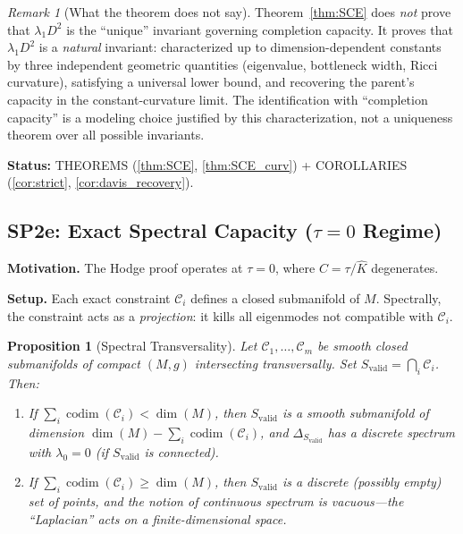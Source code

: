 \documentclass[11pt]{article}
\newtheorem{proposition}[theorem]{Proposition}
\theoremstyle{definition}
\theoremstyle{remark}
\newtheorem{remark}[theorem]{Remark}
\begin{document}
\begin{remark}[What the theorem does not say]\label{rem:notunique}
Theorem~\ref{thm:SCE} does \emph{not} prove that $\lambda_1 D^2$ is the ``unique'' invariant governing completion capacity. It proves that $\lambda_1 D^2$ is a \emph{natural} invariant: characterized up to dimension-dependent constants by three independent geometric quantities (eigenvalue, bottleneck width, Ricci curvature), satisfying a universal lower bound, and recovering the parent's capacity in the constant-curvature limit. The identification with ``completion capacity'' is a modeling choice justified by this characterization, not a uniqueness theorem over all possible invariants.
\end{remark}

\textbf{Status:} THEOREMS (\ref{thm:SCE}, \ref{thm:SCE_curv}) + COROLLARIES (\ref{cor:strict}, \ref{cor:davis_recovery}).


\subsection{SP2e: Exact Spectral Capacity ($\tau = 0$ Regime)}

\textbf{Motivation.} The Hodge proof operates at $\tau = 0$, where $C = \tau/\hat{K}$ degenerates.

\textbf{Setup.} Each exact constraint $\mathcal{C}_i$ defines a closed submanifold of $M$. Spectrally, the constraint acts as a \emph{projection}: it kills all eigenmodes not compatible with $\mathcal{C}_i$.

\begin{proposition}[Spectral Transversality]\label{prop:trans}
Let $\mathcal{C}_1, \ldots, \mathcal{C}_m$ be smooth closed submanifolds of compact $(M,g)$ intersecting transversally. Set $S_{\mathrm{valid}} = \bigcap_i \mathcal{C}_i$. Then:
\begin{enumerate}[nosep, label=(\roman*)]
\item If $\sum_i \operatorname{codim}(\mathcal{C}_i) < \dim(M)$, then $S_{\mathrm{valid}}$ is a smooth submanifold of dimension $\dim(M) - \sum_i\operatorname{codim}(\mathcal{C}_i)$, and $\Delta_{S_{\mathrm{valid}}}$ has a discrete spectrum with $\lambda_0 = 0$ (if $S_{\mathrm{valid}}$ is connected).
\item If $\sum_i \operatorname{codim}(\mathcal{C}_i) \ge \dim(M)$, then $S_{\mathrm{valid}}$ is a discrete (possibly empty) set of points, and the notion of continuous spectrum is vacuous---the ``Laplacian'' acts on a finite-dimensional space.
\end{enumerate}
\end{proposition}
\end{document}
